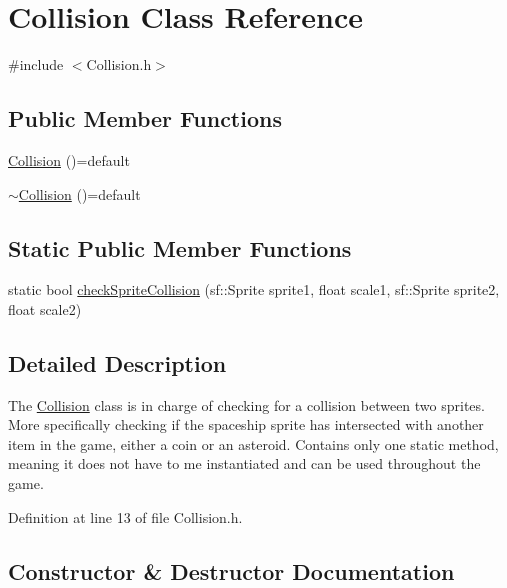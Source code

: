 \hypertarget{class_collision}{}\section{Collision Class Reference}
\label{class_collision}


{\ttfamily \#include $<$Collision.\+h$>$}

\subsection*{Public Member Functions}
\begin{DoxyCompactItemize}
\item 
\mbox{\hyperlink{class_collision_a1c247612eae832108bf79b78127f35f3}{Collision}} ()=default
\item 
\mbox{\hyperlink{class_collision_aeb427d5296152744ac2c082d29afa930}{$\sim$\+Collision}} ()=default
\end{DoxyCompactItemize}
\subsection*{Static Public Member Functions}
\begin{DoxyCompactItemize}
\item 
static bool \mbox{\hyperlink{class_collision_aae61d9a3d12eaafb20bb9f08906bb062}{check\+Sprite\+Collision}} (sf\+::\+Sprite sprite1, float scale1, sf\+::\+Sprite sprite2, float scale2)
\end{DoxyCompactItemize}


\subsection{Detailed Description}
The \mbox{\hyperlink{class_collision}{Collision}} class is in charge of checking for a collision between two sprites. More specifically checking if the spaceship sprite has intersected with another item in the game, either a coin or an asteroid. Contains only one static method, meaning it does not have to me instantiated and can be used throughout the game. 

Definition at line 13 of file Collision.\+h.



\subsection{Constructor \& Destructor Documentation}
\mbox{\label{class_collision_a1c247612eae832108bf79b78127f35f3}} 
